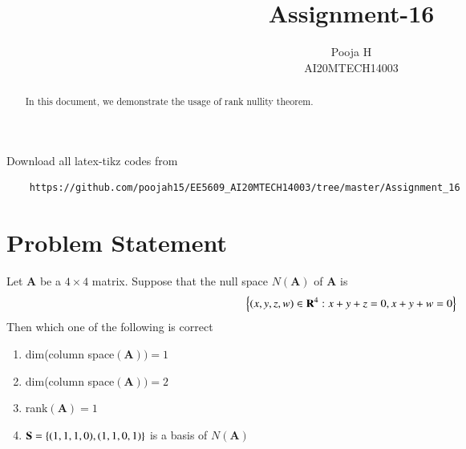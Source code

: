 \documentclass[journal,12pt,twocolumn]{IEEEtran}
\begin{document}
	\makeatother
	\let\StandardTheFigure\thefigure
	\let\vec\mathbf
	\renewcommand{\thefigure}{\theproblem}
	\def\putbox#1#2#3{\makebox[0in][l]{\makebox[#1][l]{}\raisebox{\baselineskip}[0in][0in]{\raisebox{#2}[0in][0in]{#3}}}}
	\def\rightbox#1{\makebox[0in][r]{#1}}
	\def\centbox#1{\makebox[0in]{#1}}
	\def\topbox#1{\raisebox{-\baselineskip}[0in][0in]{#1}}
	\def\midbox#1{\raisebox{-0.5\baselineskip}[0in][0in]{#1}}
	\vspace{3cm}
	\title{Assignment-16}
	\author{Pooja H \\ AI20MTECH14003}
	\maketitle
	\newpage
	\bigskip
	\renewcommand{\thefigure}{\theenumi}
	\renewcommand{\thetable}{\theenumi}
	\begin{abstract}
		In this document, we demonstrate the usage of rank nullity theorem.
	\end{abstract}
	Download all latex-tikz codes from 
\begin{lstlisting}
	https://github.com/poojah15/EE5609_AI20MTECH14003/tree/master/Assignment_16
\end{lstlisting}
	\section{Problem Statement}
	Let $\vec{A}$ be a $4 \times 4$ matrix. Suppose that the null space $N(\vec{A})$ of $\vec{A}$ is
	\begin{align}
		\cbrak{(x,y,z,w) \in \vec{R}^4 : x + y + z = 0 , x + y + w = 0}
	\end{align}
Then which one of the following is correct
\begin{enumerate}
\item  dim(column space$(\vec{A})) = 1$ 
\item dim(column space$(\vec{A})) = 2$
\item rank$(\vec{A}) = 1$
\item $\vec{S}= \cbrak{(1, 1, 1, 0), (1, 1, 0, 1)}$ is a basis of $N(\vec{A})$
\end{enumerate}
\end{document}
